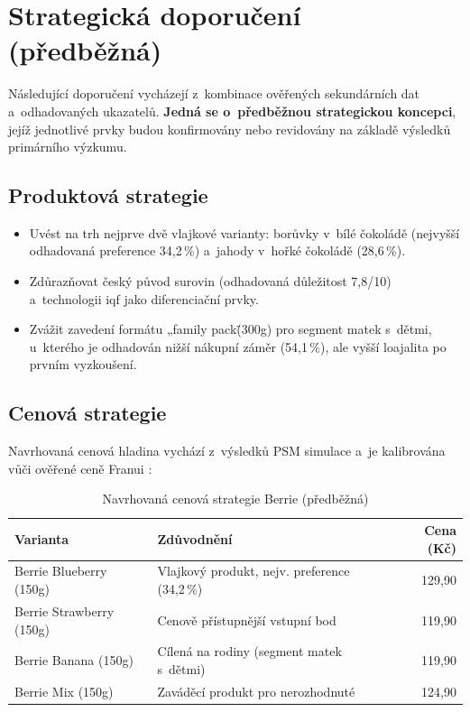 \section{Strategická doporučení (předběžná)}
\label{sec:res_strategy}

Následující doporučení vycházejí z~kombinace ověřených sekundárních dat a~odhadovaných ukazatelů. \textbf{Jedná se o~předběžnou strategickou koncepci}, jejíž jednotlivé prvky budou konfirmovány nebo revidovány na základě výsledků primárního výzkumu.

\subsection{Produktová strategie}

\begin{itemize}
  \item Uvést na trh nejprve dvě vlajkové varianty: borůvky v~bílé čokoládě (nejvyšší odhadovaná preference 34,2\,\%) a~jahody v~hořké čokoládě (28,6\,\%).
  \item Zdůrazňovat český původ surovin (odhadovaná důležitost 7,8/10) a~technologii \gls{iqf} jako diferenciační prvky.
  \item Zvážit zavedení formátu „family pack\" (300g) pro segment matek s~dětmi, u~kterého je odhadován nižší nákupní záměr (54,1\,\%), ale vyšší loajalita po prvním vyzkoušení.
\end{itemize}

\subsection{Cenová strategie}

Navrhovaná cenová hladina vychází z~výsledků PSM simulace a~je kalibrována vůči ověřené ceně Franui \parencite{rohlik_franui_2026}:

\begin{table}[H]
\centering
\caption{Navrhovaná cenová strategie Berrie (předběžná)}
\label{tab:pricing_strategy}
\begin{tabularx}{\textwidth}{lXr}
\toprule
\textbf{Varianta} & \textbf{Zdůvodnění} & \textbf{Cena (Kč)} \\
\midrule
Berrie Blueberry (150g) & Vlajkový produkt, nejv. preference (34,2\,\%) & 129,90 \\
Berrie Strawberry (150g) & Cenově přístupnější vstupní bod & 119,90 \\
Berrie Banana (150g) & Cílená na rodiny (segment matek s~dětmi) & 119,90 \\
Berrie Mix (150g) & Zaváděcí produkt pro nerozhodnuté & 124,90 \\
\bottomrule
\end{tabularx}
\end{table}

